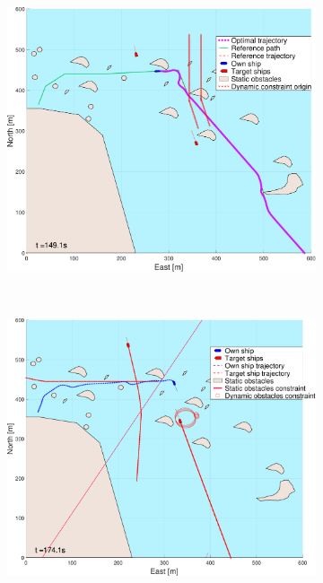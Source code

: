 \begin{figure}[ht]
    \hfill
    \begin{subfigure}[b]{0.494\textwidth}
        \centering
        \includegraphics[width=\textwidth]{Images/NewFigures/skjergard_m_trafikk_NEW/_Simple_0fig999_time=150}
        \subcaption{}
    \end{subfigure}
    \hfill
    \\
    \begin{subfigure}[b]{0.494\textwidth}
        \centering
        \includegraphics[width=\textwidth]{Images/NewFigures/skjergard_m_trafikk_NEW/_Simple_0fig1_time=175}

\end{subfigure}
\end{figure}
